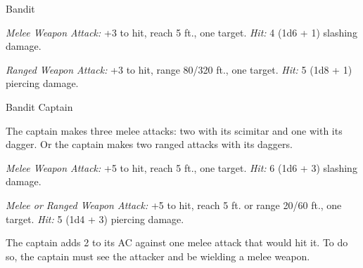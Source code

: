 \documentclass[10pt,a4paper,twoside,twocolumn,openany,nodeprecatedcode]{dndbook}
\begin{document}
\clearpage
{}

\begin{DndMonster}[float=ht]{Bandit}
\DndMonsterBasics[
armor-class = {12 (leather armor)},
hit-points = {\DndDice{2d8 + 2}},
speed = {30 ft.}
]
\DndMonsterAbilityScores[
 str = 11,
 dex = 12,
 con = 12,
 int = 10,
 wis = 10,
 cha = 10
]
\DndMonsterDetails[
languages = {any one language (usually Common)},
challenge = 1/8,
]
\par
{}
\textsl{Melee Weapon Attack:} +3 to hit, reach 5 ft., one target. \textsl{Hit:} 4 (1d6 + 1) slashing damage.

\textsl{Ranged Weapon Attack:} +3 to hit, range 80/320 ft., one target. \textsl{Hit:} 5 (1d8 + 1) piercing damage.

\end{DndMonster}


\clearpage
{}

\begin{DndMonster}[float=ht]{Bandit Captain}
\DndMonsterBasics[
armor-class = {15 (studded leather armor)},
hit-points = {\DndDice{10d8 + 20}},
speed = {30 ft.}
]
\DndMonsterAbilityScores[
 str = 15,
 dex = 16,
 con = 14,
 int = 14,
 wis = 11,
 cha = 14
]
\DndMonsterDetails[
saving-throws = {Str +4, Dex +5, Wis +2},
skills = {Athletics +4, Deception +4},
languages = {any two languages},
challenge = 2,
]
\par
{}
The captain makes three melee attacks: two with its scimitar and one with its dagger. Or the captain makes two ranged attacks with its daggers.

\textsl{Melee Weapon Attack:} +5 to hit, reach 5 ft., one target. \textsl{Hit:} 6 (1d6 + 3) slashing damage.

\textsl{Melee or Ranged Weapon Attack:} +5 to hit, reach 5 ft. or range 20/60 ft., one target. \textsl{Hit:} 5 (1d4 + 3) piercing damage.

\par
{}
The captain adds 2 to its AC against one melee attack that would hit it. To do so, the captain must see the attacker and be wielding a melee weapon.

\end{DndMonster}
\end{document}
